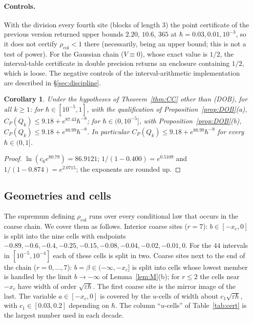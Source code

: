 \documentclass[11pt,a4paper]{article}
\newtheorem{corollary}[theorem]{Corollary}
\theoremstyle{definition}
\theoremstyle{remark}
\newcommand{\xc}{x_c}
\newcommand{\rcol}{\rho_{\mathrm{col}}}
\begin{document}
\paragraph{Controls.} With the division every fourth site (blocks of length $3$) the point certificate of the previous version returned upper bounds $2.20$, $10.6$, $365$ at $\hbar=0.03,0.01,10^{-3}$, so it does not certify $\rcol<1$ there (necessarily, being an upper bound; this is not a test of power). For the Gaussian chain ($V\equiv0$), whose exact value is $1/2$, the interval-table certificate in double precision returns an enclosure containing $1/2$, which is loose. The negative controls of the interval-arithmetic implementation are described in \S\ref{sec:discipline}.

\begin{corollary}\label{cor:points}
Under the hypotheses of Theorem~\ref{thm:CC} other than \textup{(DOB)}, for all $k\ge1$: for $\hbar\in[10^{-5},1]$, with the qualification of Proposition~\ref{prop:DOB}\textup{(a)}, $C_P(Q_k)\le9.18+e^{87.43}\hbar^{-8}$; for $\hbar\in(0,10^{-5}]$, with Proposition~\ref{prop:DOB}\textup{(b)}, $C_P(Q_k)\le9.18+e^{88.99}\hbar^{-8}$. In particular $C_P(Q_k)\le9.18+e^{88.99}\hbar^{-8}$ for every $\hbar\in(0,1]$.
\end{corollary}
\begin{proof}
$\ln(c_6e^{80.79})=86.9121$; $1/(1-0.400)=e^{0.5109}$ and $1/(1-0.874)=e^{2.0715}$; the exponents are rounded up.
\end{proof}

\subsection{Geometries and cells}\label{sec:cells}
The supremum defining $\rcol$ runs over every conditional law that occurs in the coarse chain. We cover them as follows. Interior coarse sites ($r=7$): $b\in[-\xc,0]$ is split into the nine cells with endpoints $-0.89,-0.6,-0.4,-0.25,-0.15,-0.08,-0.04,-0.02,-0.01,0$. For the $44$ intervals in $[10^{-5},10^{-4}]$ each of these cells is split in two. Coarse sites next to the end of the chain ($r=0,\dots,7$): $b=\beta\in(-\infty,-\xc]$ is split into cells whose lowest member is handled by the limit $b\to-\infty$ of Lemma~\ref{lem:M}(b); for $r\le2$ the cells near $-\xc$ have width of order $\sqrt{\varepsilon\hbar}$. The first coarse site is the mirror image of the last. The variable $a\in[-\xc,0]$ is covered by the $u$-cells of width about $c_1\sqrt{\varepsilon\hbar}$, with $c_1\in[0.03,0.2]$ depending on $\hbar$. The column ``$u$-cells'' of Table~\ref{tab:cert} is the largest number used in each decade.
\end{document}
